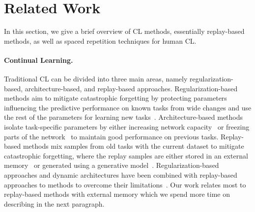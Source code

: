 
\section{Related Work}\label{paperC:sec:related_work}
In this section, we give a brief overview of CL methods, essentially replay-based methods, as well as spaced repetition techniques for human CL.

\vspace{-3mm}
\paragraph{Continual Learning.} Traditional CL can be divided into three main areas, namely regularization-based, architecture-based, and replay-based approaches. Regularization-based methods aim to mitigate catastrophic forgetting by protecting parameters influencing the predictive performance on known tasks from wide changes and use the rest of the parameters for learning new tasks~. Architecture-based methods isolate task-specific parameters by either increasing network capacity~ or freezing parts of the network~ to maintain good performance on previous tasks. 
Replay-based methods mix samples from old tasks with the current dataset to mitigate catastrophic forgetting, where the replay samples are either stored in an external memory~ or generated using a generative model~. 
Regularization-based approaches and dynamic architectures have been combined with replay-based approaches to methods to overcome their limitations~. Our work relates most to replay-based methods with external memory which we spend more time on describing in the next paragraph.



